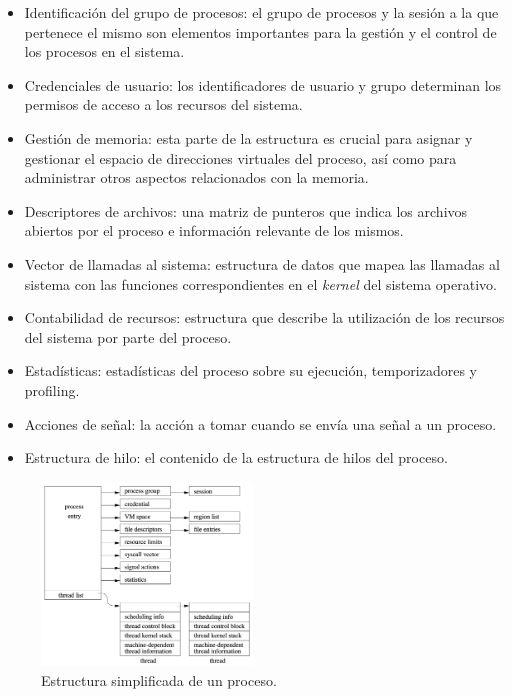 \begin{itemize}
    \item Identificación del grupo de procesos: el grupo de procesos y la sesión a la que pertenece el mismo son elementos importantes para la gestión y el control de los procesos en el sistema.
    \item Credenciales de usuario: los identificadores de usuario y grupo determinan los permisos de acceso a los recursos del sistema.
    \item Gestión de memoria: esta parte de la estructura es crucial para asignar y gestionar el espacio de direcciones virtuales del proceso, así como para administrar otros aspectos relacionados con la memoria.
    \item Descriptores de archivos: una matriz de punteros que indica los archivos abiertos por el proceso e información relevante de los mismos.
    \item Vector de llamadas al sistema: estructura de datos que mapea las llamadas al sistema con las funciones correspondientes en el \textit{kernel} del sistema operativo.
    \item Contabilidad de recursos: estructura que describe la utilización de los recursos del sistema por parte del proceso.
    \item Estadísticas: estadísticas del proceso sobre su ejecución, temporizadores y profiling.
    \item Acciones de señal: la acción a tomar cuando se envía una señal a un proceso.
    \item Estructura de hilo: el contenido de la estructura de hilos del proceso.
\end{itemize}

\begin{figure}[H]
    \centering
    \includegraphics[width=0.5\textwidth]{./images/processStructure.png}
    \caption{Estructura simplificada de un proceso.}
    \label{fig:process-state}
\end{figure}

